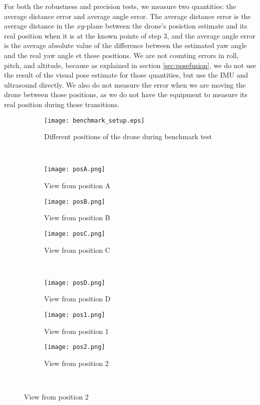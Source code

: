 For both the robustness and precision tests, we measure two quantities: the average distance error and average angle error. The average distance error is the average distance in the $xy$-plane between the drone's posistion estimate and its real position when it is at the known points of step 3, and the average angle error is the average absolute value of the difference between the estimated yaw angle and the real yaw angle et these positions. We are not counting errors in roll, pitch, and altitude, because as explained in section \ref{sec:posefusion}, we do not use the result of the visual pose estimate for those quantities, but use the IMU and ultrasound directly. We also do not measure the error when we are moving the drone between those positions, as we do not have the equipment to measure its real position during those transitions.
\begin{figure}[H]
\centering
\begin{subfigure}{\textwidth}
  \centering
  \texttt{[image: benchmark\_setup.eps]}
  \caption{Different positions of the drone during benchmark test}
  \label{fig:benchmarksetup}
\end{subfigure}\\
\vspace{20 mm}
\begin{subfigure}{.33\textwidth}
  \centering
  \texttt{[image: posA.png]}
  \caption{View from position A}
  \label{fig:viewA}
\end{subfigure}%
\begin{subfigure}{.33\textwidth}
  \centering
  \texttt{[image: posB.png]}
  \caption{View from position B}
  \label{fig:viewB}
\end{subfigure}%
\begin{subfigure}{.33\textwidth}
  \centering
  \texttt{[image: posC.png]}
  \caption{View from position C}
  \label{fig:viewC}
\end{subfigure} \\

\begin{subfigure}{.33\textwidth}
  \centering
  \texttt{[image: posD.png]}
  \caption{View from position D}
  \label{fig:viewD}
\end{subfigure}%
\begin{subfigure}{.33\textwidth}
  \centering
  \texttt{[image: pos1.png]}
  \caption{View from position 1}
  \label{fig:view1}
\end{subfigure}%
\begin{subfigure}{.33\textwidth}
  \centering
  \texttt{[image: pos2.png]}
  \caption{View from position 2}
  \label{fig:view2}
\end{subfigure} \\


\end{figure}
